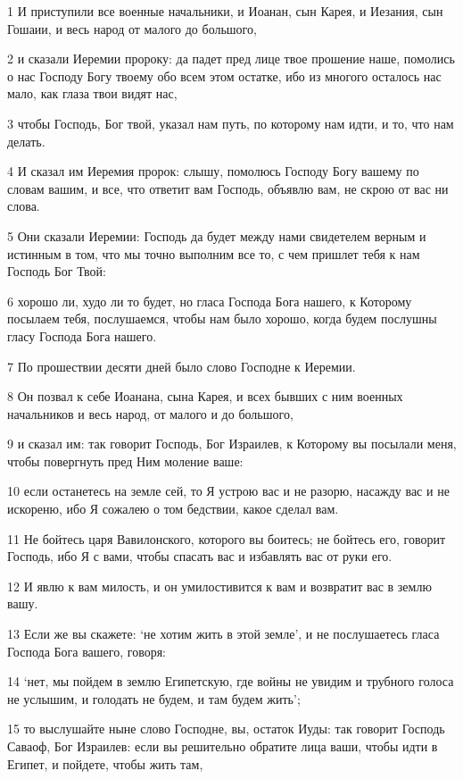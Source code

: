 \par 1 И приступили все военные начальники, и Иоанан, сын Карея, и Иезания, сын Гошаии, и весь народ от малого до большого,
\par 2 и сказали Иеремии пророку: да падет пред лице твое прошение наше, помолись о нас Господу Богу твоему обо всем этом остатке, ибо из многого осталось нас мало, как глаза твои видят нас,
\par 3 чтобы Господь, Бог твой, указал нам путь, по которому нам идти, и то, что нам делать.
\par 4 И сказал им Иеремия пророк: слышу, помолюсь Господу Богу вашему по словам вашим, и все, что ответит вам Господь, объявлю вам, не скрою от вас ни слова.
\par 5 Они сказали Иеремии: Господь да будет между нами свидетелем верным и истинным в том, что мы точно выполним все то, с чем пришлет тебя к нам Господь Бог Твой:
\par 6 хорошо ли, худо ли то будет, но гласа Господа Бога нашего, к Которому посылаем тебя, послушаемся, чтобы нам было хорошо, когда будем послушны гласу Господа Бога нашего.
\par 7 По прошествии десяти дней было слово Господне к Иеремии.
\par 8 Он позвал к себе Иоанана, сына Карея, и всех бывших с ним военных начальников и весь народ, от малого и до большого,
\par 9 и сказал им: так говорит Господь, Бог Израилев, к Которому вы посылали меня, чтобы повергнуть пред Ним моление ваше:
\par 10 если останетесь на земле сей, то Я устрою вас и не разорю, насажду вас и не искореню, ибо Я сожалею о том бедствии, какое сделал вам.
\par 11 Не бойтесь царя Вавилонского, которого вы боитесь; не бойтесь его, говорит Господь, ибо Я с вами, чтобы спасать вас и избавлять вас от руки его.
\par 12 И явлю к вам милость, и он умилостивится к вам и возвратит вас в землю вашу.
\par 13 Если же вы скажете: `не хотим жить в этой земле', и не послушаетесь гласа Господа Бога вашего, говоря:
\par 14 `нет, мы пойдем в землю Египетскую, где войны не увидим и трубного голоса не услышим, и голодать не будем, и там будем жить';
\par 15 то выслушайте ныне слово Господне, вы, остаток Иуды: так говорит Господь Саваоф, Бог Израилев: если вы решительно обратите лица ваши, чтобы идти в Египет, и пойдете, чтобы жить там,
